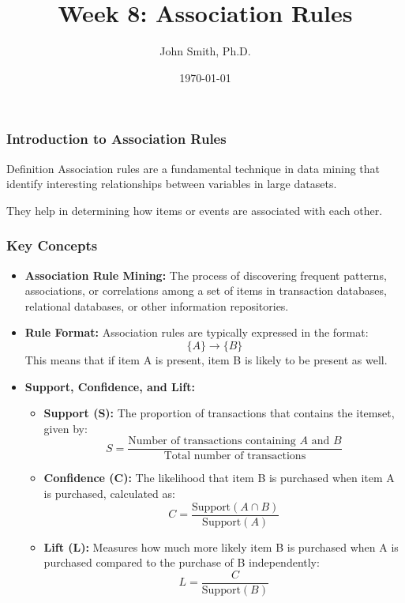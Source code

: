 \documentclass[aspectratio=169]{beamer}
\title[Week 8: Association Rules]{Week 8: Association Rules}
\author[J. Smith]{John Smith, Ph.D.}
\institute[University Name]{
  Department of Computer Science\\
  University Name\\
  \vspace{0.3cm}
  Email: email@university.edu\\
  Website: www.university.edu
}
\date{\today}
\begin{document}
\frame{\titlepage}

\begin{frame}[fragile]
    \frametitle{Introduction to Association Rules}
    \begin{block}{Definition}
        Association rules are a fundamental technique in data mining that identify interesting relationships between variables in large datasets.
    \end{block}
    They help in determining how items or events are associated with each other.
\end{frame}

\begin{frame}[fragile]
    \frametitle{Key Concepts}
    \begin{itemize}
        \item \textbf{Association Rule Mining:} 
        The process of discovering frequent patterns, associations, or correlations among a set of items in transaction databases, relational databases, or other information repositories.
        
        \item \textbf{Rule Format:} 
        Association rules are typically expressed in the format: 
        \[
        \{A\} \rightarrow \{B\}
        \]
        This means that if item A is present, item B is likely to be present as well.
        
        \item \textbf{Support, Confidence, and Lift:}
        \begin{itemize}
            \item \textbf{Support (S):} The proportion of transactions that contains the itemset, given by:
            \[
            S = \frac{\text{Number of transactions containing } A \text{ and } B}{\text{Total number of transactions}}
            \]
            
            \item \textbf{Confidence (C):} The likelihood that item B is purchased when item A is purchased, calculated as:
            \[
            C = \frac{\text{Support}(A \cap B)}{\text{Support}(A)}
            \]
            
            \item \textbf{Lift (L):} Measures how much more likely item B is purchased when A is purchased compared to the purchase of B independently:
            \[
            L = \frac{C}{\text{Support}(B)}
            \]
        \end{itemize}
    \end{itemize}
\end{frame}
\end{document}
